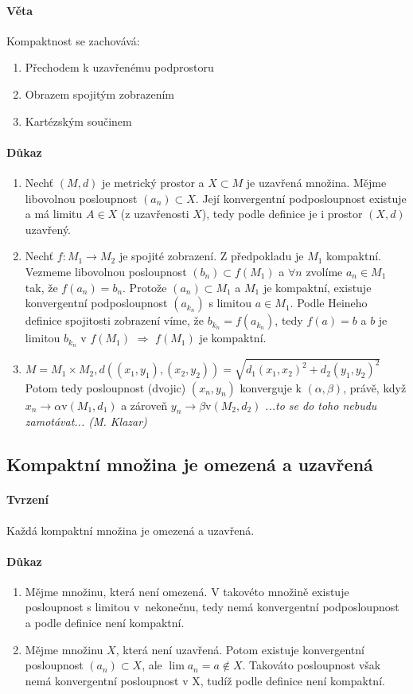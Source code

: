 \documentclass[a4paper,10pt]{article}
\begin{document}
\paragraph{Věta}
Kompaktnost se zachovává:
\begin{enumerate}
	\item Přechodem k uzavřenému podprostoru
	\item Obrazem spojitým zobrazením
	\item Kartézským součinem
\end{enumerate}
\paragraph{Důkaz}
\begin{enumerate}
	\item Nechť $(M, d)$ je metrický prostor a $X \subset M$ je uzavřená
	množina. Mějme libovolnou posloupnost $(a_n) \subset X$. Její konvergentní
	podposloupnost existuje a má limitu $A \in X$ (z uzavřenosti $X$), tedy
	podle definice je i prostor $(X, d)$ uzavřený.
	\item Nechť $f: M_1 \to M_2$ je spojité zobrazení. Z předpokladu je $M_1$ kompaktní. 
	Vezmeme libovolnou posloupnost $(b_n) \subset f(M_1)$ a $\forall n$ zvolíme $a_n \in M_1$ tak, že $f(a_n) =
	b_n$. Protože $(a_n) \subset M_1$ a $M_1$ je kompaktní, existuje
	konvergentní podposloupnost $(a_{k_n})$ s limitou $a \in M_1$. Podle Heineho
	definice spojitosti zobrazení víme, že $b_{k_n} = f(a_{k_n})$, tedy $f(a) =
	b$ a $b$ je limitou $b_{k_n}$ v $f(M_1)$ $\Rightarrow$ $f(M_1)$ je
	kompaktní.
	\item $M = M_1 \times M_2, d( (x_1, y_1), (x_2, y_2) ) = \sqrt{d_1(x_1, x_2)^2 + d_2(y_1, y_2)^2}$
	Potom tedy posloupnost (dvojic) $(x_n, y_n)$ konverguje k $(\alpha, \beta)$, právě, když 
	$x_n \rightarrow \alpha \text{v} (M_1, d_1)$ a zároveň $y_n \rightarrow \beta \text{v} (M_2, d_2)$
	\textit{...to se do toho nebudu zamotávat... (M. Klazar)}
\end{enumerate}


\subsection{Kompaktní množina je omezená a uzavřená}
\setcounter{equation}{0}
\paragraph{Tvrzení}
Každá kompaktní množina je omezená a uzavřená.
\paragraph{Důkaz}
\begin{enumerate}
\item Mějme množinu, která není omezená. V takovéto množině existuje posloupnost
s limitou v~nekonečnu, tedy nemá konvergentní podposloupnost a podle definice
není kompaktní.
\item Mějme množinu $X$, která není uzavřená. Potom existuje konvergentní
posloupnost $(a_n) \subset X$, ale $\lim a_n = a \nin X$. Takováto posloupnost
však nemá konvergentní posloupnost v X, tudíž podle definice není kompaktní.
\end{enumerate}
\end{document}
